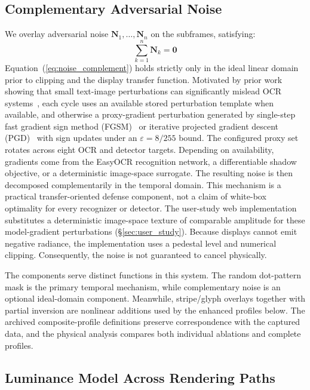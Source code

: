 \documentclass{ieeeaccess}
\begin{document}
\subsection{Complementary Adversarial Noise}

We overlay adversarial noise $\mathbf{N}_1, \ldots, \mathbf{N}_n$ on the subframes, satisfying:
\begin{equation}
\sum_{k=1}^{n}\mathbf{N}_k = \mathbf{0}
\label{eq:noise_complement}
\end{equation}
Equation~(\ref{eq:noise_complement}) holds strictly only in the ideal linear domain prior to clipping and the display transfer function. Motivated by prior work showing that small text-image perturbations can significantly mislead OCR systems~\cite{b_song2018}, each cycle uses an available stored perturbation template when available, and otherwise a proxy-gradient perturbation generated by single-step fast gradient sign method (FGSM)~\cite{b_goodfellow2015} or iterative projected gradient descent (PGD)~\cite{b_madry2018} with sign updates under an $\varepsilon=8/255$ bound. The configured proxy set rotates across eight OCR and detector targets. Depending on availability, gradients come from the EasyOCR recognition network, a differentiable shadow objective, or a deterministic image-space surrogate. The resulting noise is then decomposed complementarily in the temporal domain. This mechanism is a practical transfer-oriented defense component, not a claim of white-box optimality for every recognizer or detector. The user-study web implementation substitutes a deterministic image-space texture of comparable amplitude for these model-gradient perturbations (\S\ref{sec:user_study}). Because displays cannot emit negative radiance, the implementation uses a pedestal level and numerical clipping. Consequently, the noise is not guaranteed to cancel physically.

The components serve distinct functions in this system. The random dot-pattern mask is the primary temporal mechanism, while complementary noise is an optional ideal-domain component. Meanwhile, stripe/glyph overlays together with partial inversion are nonlinear additions used by the enhanced profiles below. The archived composite-profile definitions preserve correspondence with the captured data, and the physical analysis compares both individual ablations and complete profiles.

\subsection{Luminance Model Across Rendering Paths}
\end{document}
